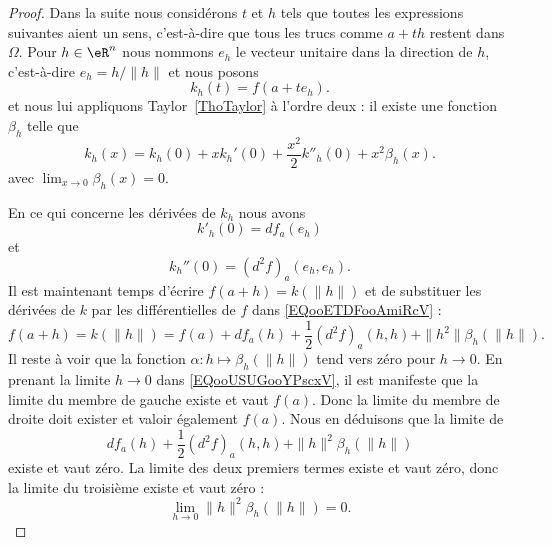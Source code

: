 \begin{proof}
    Dans la suite nous considérons \( t\) et \( h\) tels que toutes les expressions suivantes aient un sens, c'est-à-dire que tous les trucs comme \( a+th\) restent dans \( \Omega\). Pour \( h\in \eR^n\) nous nommons \( e_h\) le vecteur unitaire dans la direction de \( h\), c'est-à-dire \( e_h=h/\| h \|\) et nous posons
    \begin{equation}
        k_h(t)=f(a+te_h).
    \end{equation}
    et nous lui appliquons Taylor~\ref{ThoTaylor} à l'ordre deux : il existe une fonction \( \beta_h\) telle que
    \begin{equation}        \label{EQooETDFooAmiRcV}
        k_h(x)=k_h(0)+xk_h'(0)+\frac{ x^2 }{2}k''_h(0)+x^2\beta_h(x).
    \end{equation}
    avec \( \lim_{x\to 0} \beta_h(x)=0\).

    En ce qui concerne les dérivées de \( k_h\) nous avons
    \begin{equation}
        k'_h(0)=df_a(e_h)
    \end{equation}
    et
    \begin{equation}
        k_h''(0)=(d^2f)_{a}(e_h,e_h).
    \end{equation}
    Il est maintenant temps d'écrire \( f(a+h)=k(\| h \|)\) et de substituer les dérivées de \( k\) par les différentielles de \( f\) dans \eqref{EQooETDFooAmiRcV} :
    \begin{equation}        \label{EQooUSUGooYPscxV}
            f(a+h)=k(\| h \|)=f(a)+df_a(h)+\frac{ 1 }{2}(d^2f)_a(h,h)+\| h^2 \|\beta_{h}(\| h \|).
    \end{equation}
    Il reste à voir que la fonction \( \alpha\colon h\mapsto \beta_h(\| h \|)\) tend vers zéro pour \( h\to 0\). En prenant la limite \( h\to 0\) dans \eqref{EQooUSUGooYPscxV}, il est manifeste que la limite du membre de gauche existe et vaut \( f(a)\). Donc la limite du membre de droite doit exister et valoir également \( f(a)\). Nous en déduisons que la limite de
    \begin{equation}
        df_a(h)+\frac{ 1 }{2}(d^2f)_a(h,h)+\| h \|^2\beta_h(\| h \|)
    \end{equation}
    existe et vaut zéro. La limite des deux premiers termes existe et vaut zéro, donc la limite du troisième existe et vaut zéro :
    \begin{equation}
        \lim_{h\to 0} \| h \|^2\beta_h(\| h \|)=0.
    \end{equation}
\end{proof}

